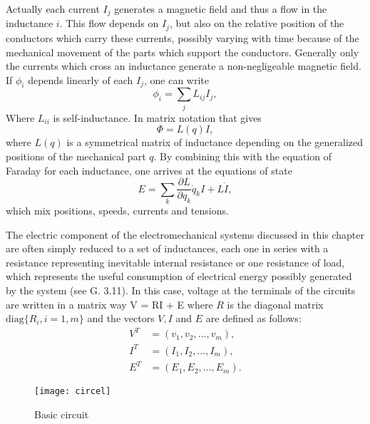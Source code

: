 Actually each current  $I_j$ generates a magnetic field and thus a flow in the inductance $i$. This flow depends on $I_j$, but also on the relative position of the conductors which carry these currents, possibly varying with time because of the mechanical movement of the parts which support the conductors. Generally only the currents which cross an inductance generate a non-negligeable magnetic field. If $\phi_i$ depends linearly of each $I_j$, one can write
\begin{equation}
\phi_i=\sum_j L_{ij} I_j,
\label{eq:PhiLI}
\end{equation}
Where   $L_{ii}$    is self-inductance. In matrix notation that gives
\begin{equation}
\Phi=L(q) I,
\label{eq:PhiLI2}
\end{equation}
where $L(q)$ is a symmetrical matrix of inductance depending on the generalized positions of the mechanical part $q$. By combining this with the equation of Faraday for each inductance, one arrives at the equations of state
\begin{equation}
E=\sum_k \frac{\partial L}{\partial q_k} \dot{q}_k I + L\dot{I},
\label{eq:VqI}
\end{equation}
which mix positions, speeds, currents and tensions.

The electric component of the electromechanical systems discussed in this chapter are often simply reduced to a set of inductances, each one in  series with a resistance representing inevitable internal resistance or one  resistance of load, which represents the useful consumption of electrical energy possibly generated by the system (see G. 3.11). In this case, voltage at the terminals of the circuits are written in a matrix way
\eqn
V = RI + E \label{ELECM}
\eeqn
where $R$ is the diagonal matrix $\mbox{diag}\{R_i, i = 1,m\}$ and the vectors  $V,I$ and $E$ are defined as follows:
\begin{equation*} \begin{split}
V^T &= (v_1, v_2, \ldots, v_m),\\
I^T &= (I_1, I_2, \ldots, I_m),\\
E^T &= (E_1, E_2, \ldots, E_m).
\end{split} \end{equation*}
\begin{figure}[t]
\begin{center}
\texttt{[image: circel]}
\caption{Basic circuit}
\label{fig:circel}
\end{center}
\end{figure}

